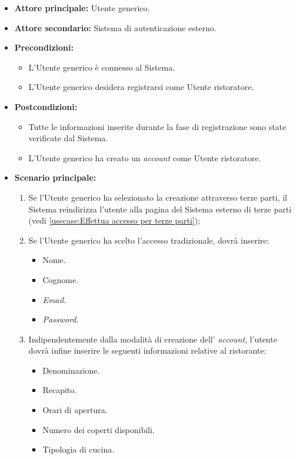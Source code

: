 \label{usecase:Effettua registrazione Utente ristoratore}
\begin{itemize}

	\item \textbf{Attore principale:} Utente generico.
	\item \textbf{Attore secondario:} Sistema di autenticazione esterno. 

	\item \textbf{Precondizioni:} 
	\begin{itemize}
        \item  L'Utente generico è connesso al Sistema.
        \item  L'Utente generico desidera registrarsi come Utente ristoratore.
    \end{itemize}
    

	\item \textbf{Postcondizioni:} 
    \begin{itemize}
        \item  Tutte le informazioni inserite durante la fase di registrazione sono state verificate dal Sistema.
        \item  L'Utente generico ha creato un \textit{account} come Utente ristoratore.
    \end{itemize}

	\item \textbf{Scenario principale:}
	\begin{enumerate}

            \item Se l'Utente generico ha selezionato la creazione attraverso terze parti, il Sistema reindirizza l'utente alla pagina del Sistema esterno di terze parti (vedi \autoref{usecase:Effettua accesso per terze parti});
            \item Se l'Utente generico ha scelto l'accesso tradizionale, dovrà inserire:
            \begin{itemize}
                \item Nome.
                \item Cognome.
                \item \textit{Email}.
                \item \textit{Password}.
            \end{itemize}

            \item Indipendentemente dalla modalità di creazione dell' \textit{account}, l'utente dovrà infine inserire le seguenti informazioni relative al ristorante:
                \begin{itemize}
                    \item Denominazione.
                    \item Recapito.
                    \item Orari di apertura.
                    \item Numero dei coperti disponibili.
                    \item Tipologia di cucina.
                \end{itemize}
	\end{enumerate}
	
\end{itemize}